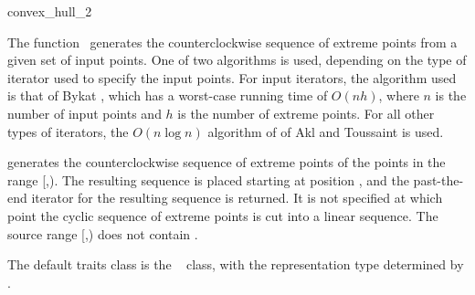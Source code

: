 

\begin{ccRefFunction}{convex_hull_2}  %

\ccDefinition
  
The function \ccRefName\ generates the counterclockwise sequence of extreme
points from a given set of input points.  One of two algorithms is used,
depending on the type of iterator used to specify the input points.  For
input iterators, the algorithm used is that of Bykat \cite{b-chfsp-78}, which 
has a worst-case running time of $O(n h)$, where $n$ is the number of input 
points and $h$ is the number of extreme points.  For all other types of 
iterators, the $O(n \log n)$ algorithm of of Akl and Toussaint 
\cite{at-fcha-78} is used.


            {generates the counterclockwise sequence of extreme points
            of the points in the range [,).
            The resulting sequence is placed starting at position
            , and the past-the-end iterator for the resulting
            sequence is returned. It is not specified at which point the
            cyclic sequence of extreme points is cut into a linear sequence.
            \ccPrecond %
            The source range [,) does not contain
            .}

The default traits class  is the \cgal\ 
 class,%
with the representation type determined by .


\end{ccRefFunction}
